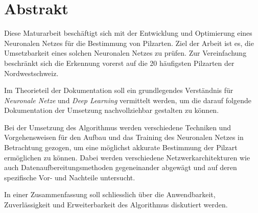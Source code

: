 \section*{Abstrakt}
\normalsize
Diese Maturarbeit beschäftigt sich mit der Entwicklung und Optimierung eines Neuronalen Netzes für die Bestimmung von Pilzarten. Ziel der Arbeit ist es, die Umsetzbarkeit eines solchen Neuronalen Netzes zu prüfen. Zur Vereinfachung beschränkt sich die Erkennung vorerst auf die 20 häufigsten Pilzarten der Nordwestschweiz.

Im Theorieteil der Dokumentation soll ein grundlegendes Verständnis für \textit{Neuronale Netze} und \textit{Deep Learning} vermittelt werden, um die darauf folgende Dokumentation der Umsetzung nachvollziehbar gestalten zu können.

Bei der Umsetzung des Algorithmus werden verschiedene Techniken und Vorgehensweisen für den Aufbau und das Training des Neuronalen Netzes in Betrachtung gezogen, um eine möglichst akkurate Bestimmung der Pilzart ermöglichen zu können. Dabei werden verschiedene Netzwerkarchitekturen wie auch Datenaufbereitungsmethoden gegeneinander abgewägt und auf deren spezifische Vor- und Nachteile untersucht.

In einer Zusammenfassung soll schliesslich über die Anwendbarkeit, Zuverlässigkeit und Erweiterbarkeit des Algorithmus diskutiert werden. 
